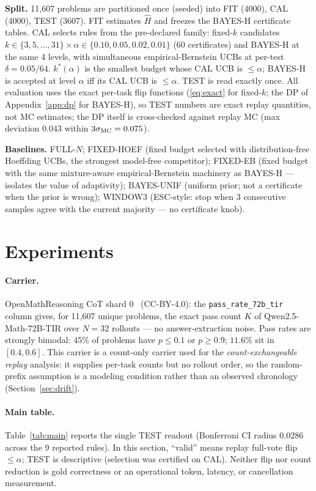\documentclass{article}
\theoremstyle{definition}
\theoremstyle{remark}
\begin{document}
\textbf{Split.} 11{,}607 problems are partitioned once (seeded) into FIT
(4000), CAL (4000), TEST (3607). FIT estimates $\widehat H$ and freezes the
BAYES-H certificate tables. CAL selects rules from the pre-declared family:
fixed-$k$ candidates $k\in\{3,5,\dots,31\}\times\alpha\in\{0.10,0.05,0.02,
0.01\}$ (60 certificates) and BAYES-H at the same 4 levels, with simultaneous
empirical-Bernstein UCBs at per-test $\delta=0.05/64$. $k^*(\alpha)$ is the
smallest budget whose CAL UCB is $\le\alpha$; BAYES-H is accepted at level
$\alpha$ iff its CAL UCB is $\le\alpha$. TEST is read exactly once. All
evaluation uses the exact per-task flip functions (\eqref{eq:exact} for
fixed-$k$; the DP of Appendix~\ref{app:dp} for BAYES-H), so TEST numbers are
exact replay quantities, not MC estimates; the DP itself is cross-checked
against replay MC (max deviation $0.043$ within $3\sigma_{\rm MC}=0.075$).

\textbf{Baselines.} FULL-$N$; FIXED-HOEF (fixed budget selected with
distribution-free Hoeffding UCBs, the strongest model-free competitor);
FIXED-EB (fixed budget with the same mixture-aware empirical-Bernstein
machinery as BAYES-H --- isolates the value of adaptivity);
BAYES-UNIF (uniform prior; not a certificate when the prior is wrong);
WINDOW3 (ESC-style: stop when 3 consecutive samples agree with the current
majority --- no certificate knob).

\section{Experiments}
\label{sec:experiments}

\paragraph{Carrier.} OpenMathReasoning CoT shard 0~\citep{moshkov2025openmathreasoning} (CC-BY-4.0): the
\texttt{pass\_rate\_72b\_tir} column gives, for 11{,}607 unique problems, the
exact pass count $K$ of Qwen2.5-Math-72B-TIR over $N=32$ rollouts --- no
answer-extraction noise. Pass rates are strongly bimodal: $45\%$ of problems
have $p\le0.1$ or $p\ge0.9$; $11.6\%$ sit in $[0.4,0.6]$. This carrier is a
count-only carrier used for the \emph{count-exchangeable replay} analysis:
it supplies per-task counts but no rollout order, so the random-prefix
assumption is a modeling condition rather than an observed chronology
(Section~\ref{sec:drift}).

\paragraph{Main table.} Table~\ref{tab:main} reports the single TEST readout
(Bonferroni CI radius $0.0286$ across the 9 reported rules). In this section,
``valid'' means replay full-vote flip $\le\alpha$; TEST is descriptive
(selection was certified on CAL). Neither flip nor count reduction is gold
correctness or an operational token, latency, or cancellation measurement.
\end{document}
